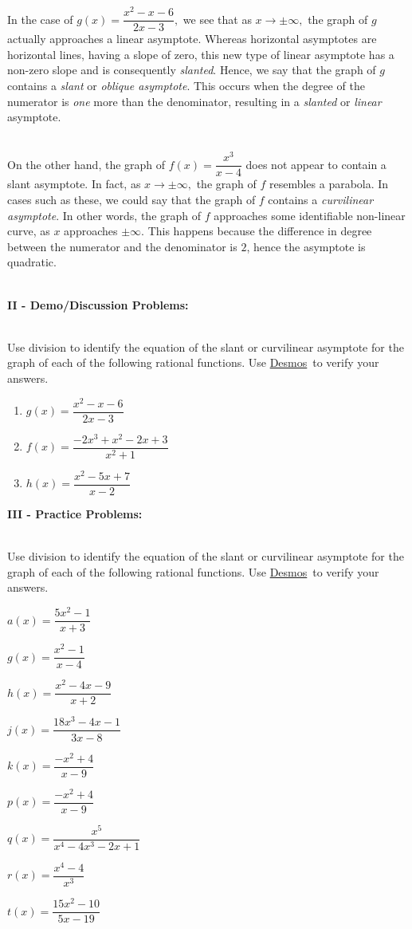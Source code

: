 \documentclass[12pt]{article}
\theoremstyle{definition}
\newcommand{\Desmos}{\href{https://www.desmos.com/}{Desmos}}
\begin{document}
In the case of $g(x)=\dfrac{x^2-x-6}{2x-3},$ we see that as $x\rightarrow\pm\infty,$ the graph of $g$ actually approaches a linear asymptote.  Whereas horizontal asymptotes are horizontal lines, having a slope of zero, this new type of linear asymptote has a non-zero slope and is consequently {\it slanted}.  Hence, we say that the graph of $g$ contains a {\it slant} or {\it oblique asymptote}. This occurs when the degree of the numerator is {\it one} more than the denominator, resulting in a {\it slanted} or {\it linear} asymptote.\\
\ \par
On the other hand, the graph of $f(x)=\dfrac{x^3}{x-4}$ does not appear to contain a slant asymptote.  In fact, as $x\rightarrow\pm\infty,$ the graph of $f$ resembles a parabola.  In cases such as these, we could say that the graph of $f$ contains a {\it curvilinear asymptote}.  In other words, the graph of $f$ approaches some identifiable non-linear curve, as $x$ approaches $\pm\infty$. This happens because the difference in degree between the numerator and the denominator is $2$, hence the asymptote is quadratic.\\
\ \par
{\bf II - Demo/Discussion Problems:}\\
\ \par
Use division to identify the equation of the slant or curvilinear asymptote for the graph of each of the following rational functions.  Use \Desmos \ to verify your answers.
\begin{enumerate}
\item $g(x)=\dfrac{x^2-x-6}{2x-3}$
\item $f(x)=\dfrac{-2x^3+x^2-2x+3}{x^2+1}$
\item $h(x)=\dfrac{x^2-5x+7}{x-2}$
\end{enumerate}
{\bf III - Practice Problems:}\\
\ \par
Use division to identify the equation of the slant or curvilinear asymptote for the graph of each of the following rational functions.  Use \Desmos \ to verify your answers.
\begin{enumerate}
\begin{multicols}{2}
\item $a(x)=\dfrac{5x^2-1}{x+3}$
\item $g(x)=\dfrac{x^2-1}{x-4}$
\item $h(x)=\dfrac{x^2-4x-9}{x+2}$
\item $j(x)=\dfrac{18x^3-4x-1}{3x-8}$
\item $k(x)=\dfrac{-x^2+4}{x-9}$
\item $p(x)=\dfrac{-x^2+4}{x-9}$
\item $q(x)=\dfrac{x^5}{x^4-4x^3-2x+1}$
\item $r(x)=\dfrac{x^4-4}{x^3}$
\item $t(x)=\dfrac{15x^2-10}{5x-19}$
\end{multicols}
\end{enumerate}
\newpage
\end{document}
